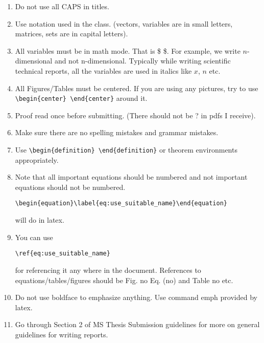 \documentclass[10pt,a4paper]{article}
\newtheorem{definition}{Definition}
\begin{document}
\begin{enumerate}
\item Do not use all CAPS in titles.
\item Use notation used in the class. (vectors, variables are in small letters, matrices, sets are in capital letters).

\item All variables must be in math mode. That is \$ \$. 
For example, we write  $n$-dimensional and not n-dimensional. 
Typically while writing scientific technical reports, all the variables are used in italics like $x$, $n$ etc.

\item All Figures/Tables must be centered. 
If you are using any pictures, try to use \\ \verb|\begin{center} \end{center}| around it.

\item Proof read once before submitting. (There should not be ? in pdfs I receive).

\item Make sure there are no spelling mistakes and grammar mistakes.

\item Use \verb|\begin{definition} \end{definition}| or theorem environments appropriately.

\item Note that all important equations should be numbered and not important equations should not be numbered. 
\begin{verbatim}
\begin{equation}\label{eq:use_suitable_name}\end{equation}
\end{verbatim} will do in latex.

\item You can use \begin{verbatim}
\ref{eq:use_suitable_name}
\end{verbatim} for referencing it any where in the document.
References to equations/tables/figures should be Fig. no Eq. (no) and Table no etc. 

\item Do not use boldface to emphasize anything.  Use command emph provided by latex.

\item Go through Section 2 of MS Thesis Submission guidelines for more on general guidelines for writing reports.



\end{enumerate}
\end{document}
